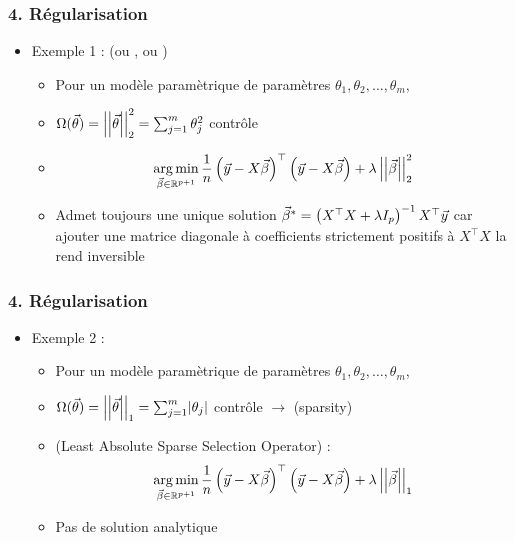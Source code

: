 \begin{frame}
  \frametitle{4. Régularisation}
  \begin{itemize}
  \item Exemple 1 :  (ou , ou )
    \begin{itemize}
    \item Pour un modèle paramètrique de paramètres $\theta_1, \theta_2, \dots, \theta_m$,
    \item[] $\Omega(\vec{\theta}) = \left|\left|\vec{\theta}\right|\right|_2^2 = \sum_{j=1}^m \theta_j^2$ contrôle  
      \pause
      \vspace{1em}
    \item {}
      \[\operatorname*{arg\,min}_{\vec{\beta} \in {\mathbb R}^{p+1}} \frac1n 
        \left(\vec{y} - X \vec{\beta} \right)^\top \left(\vec{y} - X \vec{\beta}
        \right) + \lambda \left|\left|\vec{\beta}\right|\right|_2^2 \]
    \item[] Admet toujours une unique solution
      $\vec{\beta}^* = \left(X^\top X + \lambda I_p \right)^{-1} X^\top \vec{y}$
      car ajouter une matrice diagonale à coefficients strictement positifs à
      $X^\top X$ la rend inversible
    \end{itemize}
  \end{itemize}
\end{frame}

\begin{frame}
  \frametitle{4. Régularisation }
  \begin{itemize}
  \item Exemple 2 :  
    \begin{itemize}
    \item Pour un modèle paramètrique de paramètres $\theta_1, \theta_2, \dots, \theta_m$,
    \item[]
      $\Omega(\vec{\theta}) = \left|\left|\vec{\theta}\right|\right|_1 = \sum_{j=1}^m \lvert \theta_j
      \rvert$ contrôle  $\rightarrow$
       \textcolor{gray!70}{(sparsity)} \pause \vspace{1em}
    \item {} (Least Absolute Sparse Selection Operator) :
      \[\operatorname*{arg\,min}_{\vec{\beta} \in {\mathbb R}^{p+1}} \frac1n 
        \left(\vec{y} - X \vec{\beta} \right)^\top \left(\vec{y} - X \vec{\beta}
        \right) + \lambda \left|\left|\vec{\beta}\right|\right|_1 \]
    \item Pas de solution analytique 
    \end{itemize}
  \end{itemize}
\end{frame}

